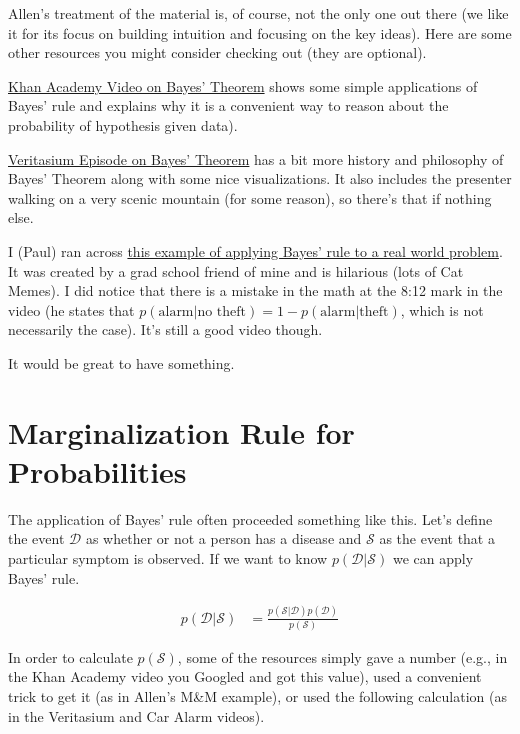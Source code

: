 \documentclass[assignment01_Solutions]{subfiles}
\begin{document}
\begin{externalresources}[(75 minutes)]
Allen's treatment of the material is, of course, not the only one out there (we like it for its focus on building intuition and focusing on the key ideas).  Here are some other resources you might consider checking out (they are optional).
\bi
\item \href{https://www.khanacademy.org/partner-content/wi-phi/wiphi-critical-thinking/wiphi-fundamentals/v/bayes-theorem}{Khan Academy Video on Bayes' Theorem} shows some simple applications of Bayes' rule and explains why it is a convenient way to reason about the probability of hypothesis given data).
\item \href{https://www.youtube.com/watch?v=R13BD8qKeTg}{Veritasium Episode on Bayes' Theorem} has a bit more history and philosophy of Bayes' Theorem along with some nice visualizations.  It also includes the presenter walking on a very scenic mountain (for some reason), so there's that if nothing else.
\item I (Paul) ran across \href{https://youtube.com/watch?v=nvqXXlz-rx0}{this example of applying Bayes' rule to a real world problem}.  It was created by a grad school friend of mine and is hilarious (lots of Cat Memes).  I did notice that there is a mistake in the math at the 8:12 mark in the video (he states that $p(\mbox{alarm} | \mbox{no theft}) = 1 - p(\mbox{alarm} | \mbox{theft})$, which is not necessarily the case).  It's still a good video though.
\ei

\end{externalresources}

\begin{exercise}
It would be great to have something.
\end{exercise}

\section{Marginalization Rule for Probabilities}
The application of Bayes' rule often proceeded something like this.  Let's define the event $\mathcal{D}$ as whether or not a person has a disease and $\mathcal{S}$ as the event that a particular symptom is observed.  If we want to know $p(\mathcal{D} | \mathcal{S})$ we can apply Bayes' rule.

\begin{align}
p(\mathcal{D} | \mathcal{S}) &= \frac{p(\mathcal{S} | \mathcal{D}) p(\mathcal{D})}{p(\mathcal{S})} \label{eq:bayesdenominator}
\end{align}

In order to calculate $p(\mathcal{S})$, some of the resources simply gave a number (e.g., in the Khan Academy video you Googled and got this value), used a convenient trick to get it (as in Allen's M\&M example), or used the following calculation (as in the Veritasium and Car Alarm videos).
\end{document}
